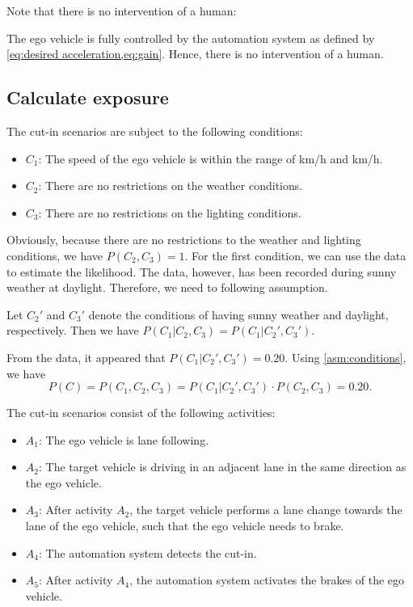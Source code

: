 Note that there is no intervention of a human:
\begin{assumption}
	The ego vehicle is fully controlled by the automation system as defined by \cref{eq:desired acceleration,eq:gain}. Hence, there is no intervention of a human.
\end{assumption}



\subsection{Calculate exposure}

The cut-in scenarios are subject to the following conditions:
\begin{itemize}
	\item $C_1$: The speed of the ego vehicle is within the range of \unit[60]{km/h} and \unit[130]{km/h}.
	\item $C_2$: There are no restrictions on the weather conditions.
	\item $C_3$: There are no restrictions on the lighting conditions.
\end{itemize}

Obviously, because there are no restrictions to the weather and lighting conditions, we have $P(C_2,C_3)=1$. For the first condition, we can use the data to estimate the likelihood. The data, however, has been recorded during sunny weather at daylight. Therefore, we need to following assumption.

\begin{assumption} \label{asm:conditions}
	Let $C_2'$ and $C_3'$ denote the conditions of having sunny weather and daylight, respectively. Then we have $P(C_1|C_2,C_3)=P(C_1|C_2',C_3')$.
\end{assumption}

From the data, it appeared that $P(C_1|C_2',C_3')=0.20$. Using \cref{asm:conditions}, we have
\begin{equation}
	P(C) = P(C_1,C_2,C_3) = P(C_1|C_2',C_3')\cdot P(C_2,C_3) = 0.20.
\end{equation}

The cut-in scenarios consist of the following activities:
\begin{itemize}
	\item $A_1$: The ego vehicle is lane following.
	\item $A_2$: The target vehicle is driving in an adjacent lane in the same direction as the ego vehicle.
	\item $A_3$: After activity $A_2$, the target vehicle performs a lane change towards the lane of the ego vehicle, such that the ego vehicle needs to brake.
	\item $A_4$: The automation system detects the cut-in.
	\item $A_5$: After activity $A_4$, the automation system activates the brakes of the ego vehicle.
\end{itemize}

